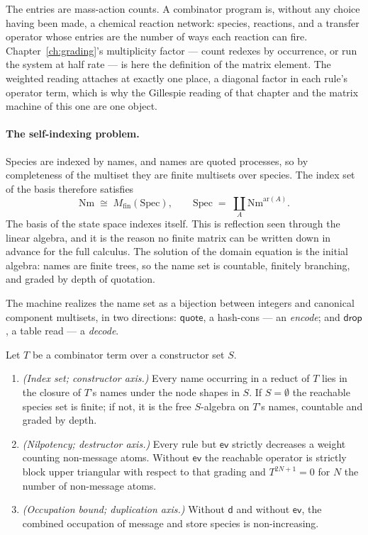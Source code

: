 The entries are mass-action counts. A combinator program is, without any choice having
been made, a chemical reaction network: species, reactions, and a transfer operator whose
entries are the number of ways each reaction can fire. Chapter~\ref{ch:grading}'s
multiplicity factor --- count redexes by occurrence, or run the system at half rate --- is
here the definition of the matrix element. The weighted reading attaches at exactly one
place, a diagonal factor in each rule's operator term, which is why the Gillespie reading
of that chapter and the matrix machine of this one are one object.

\paragraph{The self-indexing problem.} Species are indexed by names, and names are quoted
processes, so by completeness of the multiset they are finite multisets over species. The
index set of the basis therefore satisfies
\[
  \mathrm{Nm} \;\cong\; M_{\mathrm{fin}}(\mathrm{Spec}), \qquad
  \mathrm{Spec} \;=\; \textstyle\coprod_{A} \mathrm{Nm}^{\mathrm{ar}(A)} .
\]
The basis of the state space indexes itself. This is reflection seen through the linear
algebra, and it is the reason no finite matrix can be written down in advance for the full
calculus. The solution of the domain equation is the initial algebra: names are finite
trees, so the name set is countable, finitely branching, and graded by depth of quotation.

\begin{definition}
\label{cb:def:intern}
The machine realizes the name set as a bijection between integers and canonical component
multisets, in two directions: $\mathsf{quote}$, a hash-cons --- an \emph{encode}; and
$\mathsf{drop}$, a table read --- a \emph{decode}.
\end{definition}

\begin{theorem}
\label{cb:thm:three}
Let $T$ be a combinator term over a constructor set $S$.
\begin{enumerate}[label=(\roman*),leftmargin=2.4em]
\item \emph{(Index set; constructor axis.)} Every name occurring in a reduct of $T$ lies in
the closure of $T$'s names under the node shapes in $S$. If $S=\emptyset$ the reachable
species set is finite; if not, it is the free $S$-algebra on $T$'s names, countable and
graded by depth.
\item \emph{(Nilpotency; destructor axis.)} Every rule but $\mathsf{ev}$ strictly decreases
a weight counting non-message atoms. Without $\mathsf{ev}$ the reachable operator is
strictly block upper triangular with respect to that grading and $T^{2N+1} = 0$ for $N$ the
number of non-message atoms.
\item \emph{(Occupation bound; duplication axis.)} Without $\mathsf{d}$ and without
$\mathsf{ev}$, the combined occupation of message and store species is non-increasing.
\end{enumerate}
\end{theorem}


